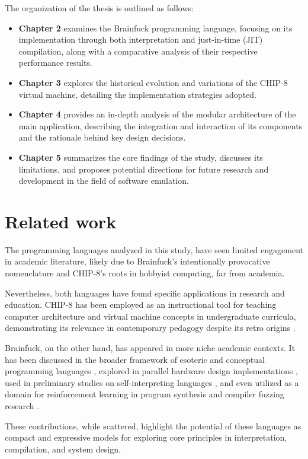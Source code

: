 \clearpage

\par The organization of the thesis is outlined as follows:

\begin{itemize}
    \item \textbf{Chapter 2} examines the Brainfuck programming language, focusing on its implementation through both interpretation and just-in-time (JIT) compilation, along with a comparative analysis of their respective performance results.
    \item \textbf{Chapter 3} explores the historical evolution and variations of the CHIP-8 virtual machine, detailing the implementation strategies adopted.
    \item \textbf{Chapter 4} provides an in-depth analysis of the modular architecture of the main application, describing the integration and interaction of its components and the rationale behind key design decisions.
    \item \textbf{Chapter 5} summarizes the core findings of the study, discusses its limitations, and proposes potential directions for future research and development in the field of software emulation.
\end{itemize}

\section*{Related work}
\label{chap:ch1sec2}

\par The programming languages analyzed in this study, have seen limited engagement in academic literature, likely due to Brainfuck's intentionally provocative nomenclature and CHIP-8's roots in hobbyist computing, far from academia.

\par Nevertheless, both languages have found specific applications in research and education. CHIP-8 has been employed as an instructional tool for teaching computer architecture and virtual machine concepts in undergraduate curricula, demonstrating its relevance in contemporary pedagogy despite its retro origins \cite{Chip8Applications2019}.

\par Brainfuck, on the other hand, has appeared in more niche academic contexts. It has been discussed in the broader framework of esoteric and conceptual programming languages \cite{BFEsolang2015, BFConceptual2017}, explored in parallel hardware design implementations \cite{BFHardware2016}, used in preliminary studies on self-interpreting languages \cite{BFSelfInterpreter2003}, and even utilized as a domain for reinforcement learning in program synthesis and compiler fuzzing research \cite{BFReinforcementLearining2022}.

\par These contributions, while scattered, highlight the potential of these languages as compact and expressive models for exploring core principles in interpretation, compilation, and system design.